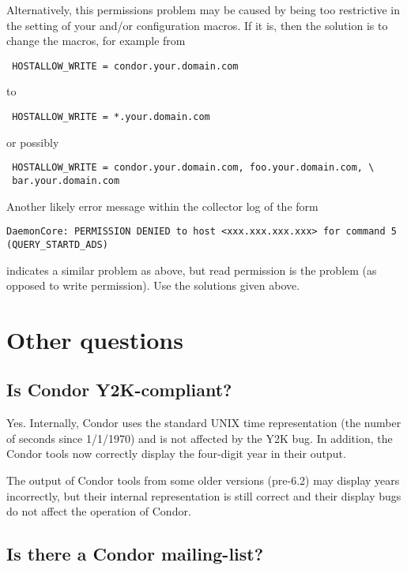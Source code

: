 Alternatively, this permissions problem
may be caused by being too restrictive in the setting of
your  and/or
 configuration macros.
If it is, then the solution is to change the macros,
for example from
\begin{verbatim}
 HOSTALLOW_WRITE = condor.your.domain.com
\end{verbatim}
to
\begin{verbatim}
 HOSTALLOW_WRITE = *.your.domain.com
\end{verbatim}
or possibly
\begin{verbatim}
 HOSTALLOW_WRITE = condor.your.domain.com, foo.your.domain.com, \
 bar.your.domain.com 
\end{verbatim}


Another likely error message within the collector log of the form
\begin{verbatim}
DaemonCore: PERMISSION DENIED to host <xxx.xxx.xxx.xxx> for command 5 (QUERY_STARTD_ADS)
\end{verbatim}
indicates a similar problem as above, but read permission
is the problem (as opposed to write permission).
Use the solutions given above.

\section{Other questions}

\subsection{Is Condor Y2K-compliant?}

Yes.
Internally, Condor uses the standard UNIX time representation (the
number of seconds since 1/1/1970) and is not affected by the Y2K bug.
In addition, the Condor tools now correctly display the four-digit
year in their output.

The output of Condor tools from some older versions (pre-6.2) may
display years incorrectly, but their internal representation is still
correct and their display bugs do not affect the operation of Condor.


\subsection{Is there a Condor mailing-list?}

